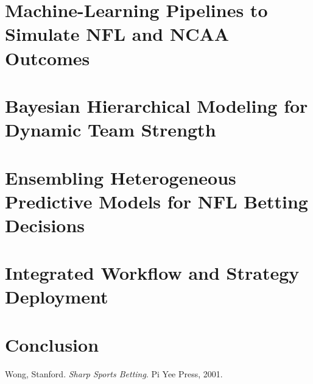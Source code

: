\documentclass[letterpaper,sfsidenotes]{tufte-handout}
\begin{document}
\section{Machine-Learning Pipelines to Simulate NFL and NCAA Outcomes}

\section{Bayesian Hierarchical Modeling for Dynamic Team Strength}

\section{Ensembling Heterogeneous Predictive Models for NFL Betting Decisions}

\section{Integrated Workflow and Strategy Deployment}

\section{Conclusion}

\begin{thebibliography}{99}
 Wong, Stanford. \emph{Sharp Sports Betting}. Pi Yee Press, 2001.
\end{thebibliography}

% 
\end{document}
